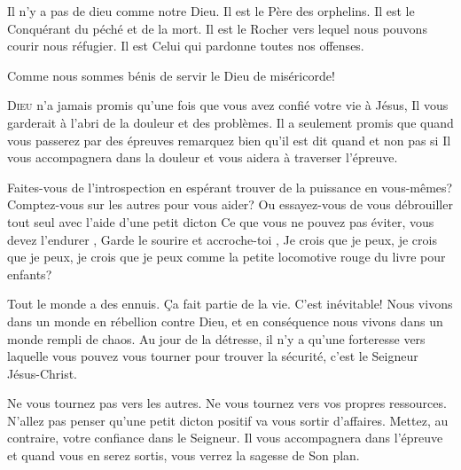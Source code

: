 Il n'y a pas de dieu comme notre Dieu. Il est le Père des orphelins.
 Il est le Conquérant du péché et de la mort. Il est le Rocher
 vers lequel nous pouvons courir nous réfugier.
 Il est Celui qui pardonne toutes nos offenses. 

Comme nous sommes bénis de servir le Dieu de miséricorde! 

\dvrule






\lettrine{D}{ieu} n'a jamais promis qu'une fois que vous avez confié
 votre vie à Jésus, Il vous garderait à l'abri de la douleur et des problèmes.
 Il a seulement promis que quand vous passerez par des épreuves
 \ocadr remarquez bien qu'il est dit \Og quand \Fg{} et non pas \Og si \Fg{} \fcadr
 Il vous accompagnera dans la douleur et vous aidera à traverser l'épreuve. 


Faites-vous de l'introspection en espérant trouver de la puissance
 en vous-mêmes? Comptez-vous sur les autres pour vous aider?
 Ou essayez-vous de vous débrouiller tout seul avec l'aide d'une petit dicton\frcolon{}
 \Og Ce que vous ne pouvez pas éviter, vous devez l'endurer \Fg{},
 \Og Garde le sourire et accroche-toi \Fg{},
 \Og Je crois que je peux, je crois que je peux, je crois que je peux \Fg{}
 comme la petite locomotive rouge du livre pour enfants? 

Tout le monde a des ennuis. Ça fait partie de la vie. C'est inévitable!
 Nous vivons dans un monde en rébellion contre Dieu, et en conséquence
 nous vivons dans un monde rempli de chaos. Au jour de la détresse,
 il n'y a qu'une forteresse vers laquelle vous pouvez vous tourner
 pour trouver la sécurité, c'est le Seigneur Jésus-Christ. 

Ne vous tournez pas vers les autres. Ne vous tournez vers vos propres
 ressources. N'allez pas penser qu'une petit dicton positif va vous sortir
 d'affaires. Mettez, au contraire, votre confiance dans le Seigneur.
 Il vous accompagnera dans l'épreuve et quand vous en serez sortis,
 vous verrez la sagesse de Son plan. 

